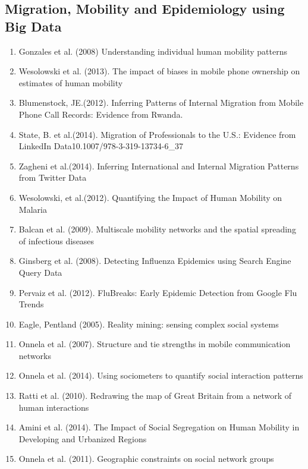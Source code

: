 \subsection{Migration, Mobility and Epidemiology using Big Data}  \begin{enumerate} 
\item Gonzales et al. (2008)  Understanding individual human mobility patterns\cite{Gonz_lez_2008} 
\item Wesolowski et al. (2013).  The impact of biases in mobile phone ownership on estimates of human mobility\cite{Wesolowski_2013}  
\item  Blumenstock, JE.(2012).  Inferring Patterns of Internal Migration from Mobile Phone Call Records: Evidence from Rwanda\cite{Blumenstock_2012}.   
\item  State, B. et al.(2014).  Migration of Professionals to the U.S.: Evidence from LinkedIn Data10.1007/978-3-319-13734-6_37\cite{State_2014}  
\item  Zagheni et al.(2014).  Inferring International and Internal Migration Patterns from Twitter Data\cite{Zagheni:2014:III:2567948.2576930}  
\item  Wesolowski, et al.(2012).  Quantifying the Impact of Human Mobility on Malaria \cite{Wesolowski_2012} 
\item Balcan et al. (2009).  Multiscale mobility networks and the spatial spreading of infectious diseases\cite{Balcan_2009}  
\item Ginsberg et al. (2008).  Detecting Influenza Epidemics using Search Engine Query Data\cite{Ginsberg_2008} 
\item Pervaiz et al. (2012).  FluBreaks: Early Epidemic Detection from Google Flu Trends\cite{Pervaiz_2012}   
\item Eagle, Pentland (2005).  Reality mining: sensing complex social systems\cite{Eagle_2005} 
\item Onnela et al. (2007).  Structure and tie strengths in mobile communication networks\cite{Onnela_2007}   
\item Onnela et al. (2014).  Using sociometers to quantify social interaction patterns\cite{Onnela_2014}   
\item Ratti et al. (2010).  Redrawing the map of Great Britain from a network of human interactions\cite{Ratti_2010} 
\item Amini et al. (2014).  The Impact of Social Segregation on Human Mobility in Developing and Urbanized Regions\cite{Amini_2014}   
\item Onnela et al. (2011).  Geographic constraints on social network groups\cite{Onnela_2011} 


\end{enumerate}
